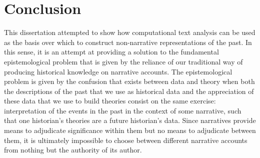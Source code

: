 \chapter{Conclusion}
\label{chap:conc}

This dissertation attempted to show how computational text analysis can be used as the basis over which to construct non-narrative representations of the past.
In this sense, it is an attempt at providing a solution to the fundamental epistemological problem that is given by the reliance of our traditional way of producing historical knowledge on narrative accounts.
The epistemological problem is given by the confusion that exists between data and theory when both the descriptions of the past that we use as historical data and the appreciation of these data that we use to build theories consist on the same exercise: interpretation of the events in the past in the context of some narrative, such that one historian's theories are a future historian's data.
Since narratives provide means to adjudicate significance within them but no means to adjudicate between them, it is ultimately impossible to choose between different narrative accounts from nothing but the authority of its author.

